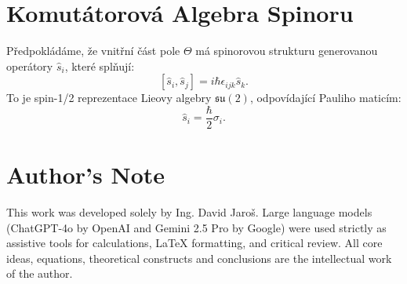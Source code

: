 \documentclass{article}
\begin{document}
\section*{Komutátorová Algebra Spinoru}

Předpokládáme, že vnitřní část pole \(\Theta\) má spinorovou strukturu generovanou operátory \(\hat{s}_i\), které splňují:
\[
[\hat{s}_i, \hat{s}_j] = i \hbar \epsilon_{ijk} \hat{s}_k.
\]
To je spin-1/2 reprezentace Lieovy algebry \(\mathfrak{su}(2)\), odpovídající Pauliho maticím:
\[
\hat{s}_i = \frac{\hbar}{2} \sigma_i.
\]


\section*{Author's Note}

This work was developed solely by Ing. David Jaroš.  
Large language models (ChatGPT-4o by OpenAI and Gemini 2.5 Pro by Google) were used strictly as assistive tools for calculations, LaTeX formatting, and critical review.  
All core ideas, equations, theoretical constructs and conclusions are the intellectual work of the author.
\end{document}

